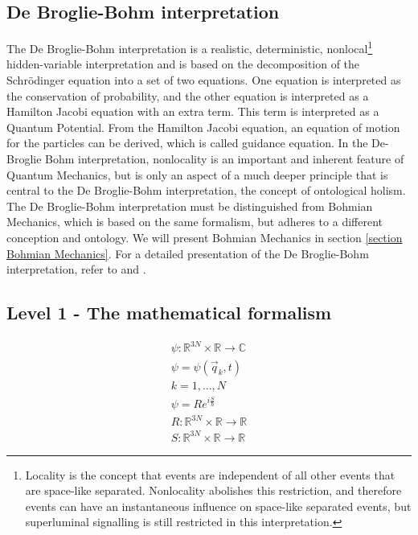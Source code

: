 \documentclass{article}
\begin{document}
\newpage 
 
   
\subsection{De Broglie-Bohm interpretation}
The De Broglie-Bohm interpretation is a realistic, deterministic, nonlocal\footnote{Locality is the concept that events are independent of all other events that are space-like separated. Nonlocality abolishes this restriction, and therefore events can have an instantaneous influence on space-like separated events, but superluminal signalling is still restricted in this interpretation.} hidden-variable interpretation and is based on the decomposition of the Schr\"odinger equation into a set of two equations. One equation is interpreted as the conservation of probability, and the other equation is interpreted as a Hamilton Jacobi equation with an extra term. This term is interpreted as a Quantum Potential. From the Hamilton Jacobi equation, an equation of motion for the particles can be derived, which is called guidance equation. In the De-Broglie Bohm interpretation, nonlocality is an important and inherent feature of Quantum Mechanics, but is only an aspect of a much deeper principle that is central to the De Broglie-Bohm interpretation, the concept of ontological holism. The De Broglie-Bohm interpretation must be distinguished from Bohmian Mechanics, which is based on the same formalism, but adheres to a different conception and ontology. We will present Bohmian Mechanics in section \ref{section Bohmian Mechanics}. For a detailed presentation of the De Broglie-Bohm interpretation, refer to \cite[]{bohm1981wholeness} and \cite[]{holland1995quantum}. 

\subsection*{Level 1 - The mathematical formalism}

\begin{eqnarray}
\psi: \mathbb{R}^{3N} \times \mathbb{R} \to \mathbb{C} \\
\psi=\psi(\vec q_k, t) \\
k = 1,..., N \\
\psi=R e^{i\frac{S}{\hbar}} \\
\label{equ_Polar decomposition}
R: \mathbb{R}^{3N} \times \mathbb{R} \to \mathbb{R} \\
S: \mathbb{R}^{3N} \times \mathbb{R} \to \mathbb{R} 
\end{eqnarray}
\end{document}
